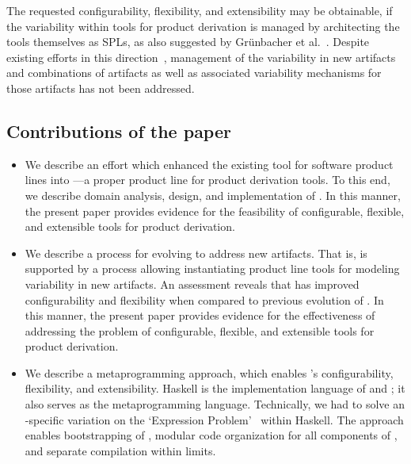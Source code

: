 

The requested configurability, flexibility, and extensibility may be obtainable, if the variability within tools for product derivation is managed by architecting the tools themselves as SPLs, as also suggested by Gr{\"u}nbacher et al.~\cite{grunbacher:2008}. Despite existing efforts in this direction~\cite{grunbacher:2011,grunbacher:2008,batory-ahead-bootstrap}, management of the variability in new artifacts and combinations of artifacts as well as associated variability mechanisms for those artifacts has not been addressed. 


\subsection*{Contributions of the paper}

\begin{itemize}

\item We describe an effort which enhanced the existing \hp{} tool for software product lines into \hpl---a proper
  product line for product derivation tools. To this end, we describe domain analysis, design, and implementation of \hpl. In this manner, the present paper provides evidence for the feasibility of configurable, flexible, and extensible tools for product derivation.

\item We describe a process for evolving \hpl{} to address new artifacts. That is, \hpl{} is supported by a process allowing instantiating product line tools for modeling variability in new artifacts. An assessment reveals that \hpl{} has improved configurability and flexibility when compared to previous evolution of \hp. In this manner, the present paper provides evidence for the effectiveness of addressing the problem of configurable, flexible, and extensible tools for product derivation.

\item We describe a metaprogramming approach, which enables \hpl's configurability, flexibility, and extensibility.  Haskell is the implementation language of \hp{} and \hpl{}; it also serves as the metaprogramming language.  Technically, we had to solve an \hp-specific variation on the `Expression Problem'~\cite{Wadler98,Lopez-HerrejonBC05} within Haskell. The approach enables bootstrapping of \hpl{}, modular code organization for all components of \hpl{}, and separate compilation within limits.

\end{itemize}

